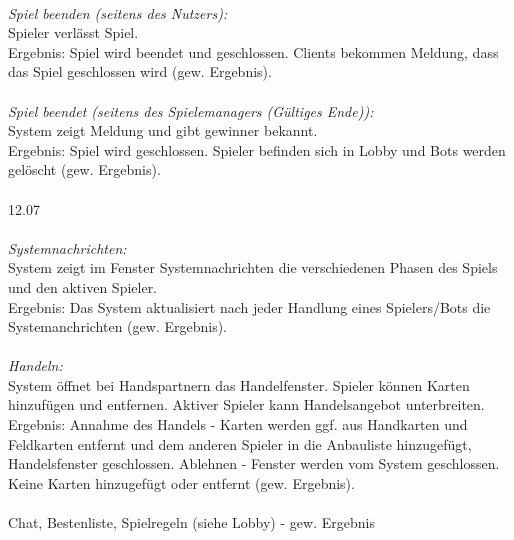 \documentclass[10pt]{report}
\begin{document}
		\\
		\textsl{Spiel beenden (seitens des Nutzers):} \\
		Spieler verlässt Spiel. \\
		Ergebnis: Spiel wird beendet und geschlossen. Clients bekommen Meldung, dass das Spiel 						geschlossen wird (gew. Ergebnis). \\
		\\
		\textsl{Spiel beendet (seitens des Spielemanagers (G\"ultiges Ende)):} \\
		System zeigt Meldung und gibt gewinner bekannt. \\
		Ergebnis: Spiel wird geschlossen. Spieler befinden sich in Lobby und Bots werden gel\"oscht (gew. 		Ergebnis). \\
		\\
		12.07 \\
		\\
		\textsl{Systemnachrichten:} \\
		System zeigt im Fenster Systemnachrichten die verschiedenen Phasen des Spiels und den aktiven Spieler. \\
		Ergebnis: Das System aktualisiert nach jeder Handlung eines Spielers/Bots die Systemanchrichten (gew. Ergebnis).\\
		\\
		\textsl{Handeln:} \\
		System öffnet bei Handspartnern das Handelfenster. Spieler können Karten hinzufügen und entfernen. Aktiver Spieler kann Handelsangebot unterbreiten. \\
		Ergebnis: Annahme des Handels - Karten werden ggf. aus Handkarten und Feldkarten entfernt und dem anderen Spieler in die Anbauliste hinzugefügt, Handelsfenster geschlossen. 			Ablehnen - Fenster werden vom System geschlossen. Keine Karten hinzugefügt oder entfernt (gew. Ergebnis).\\
		\\
		Chat, Bestenliste, Spielregeln (siehe Lobby) - gew. Ergebnis
		\\
\end{document}
